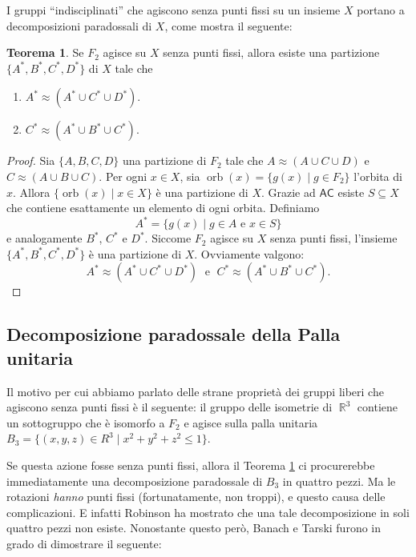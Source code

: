 \documentclass[12pt,a4paper]{report}
\theoremstyle{definition}
\newtheorem{teo}{Teorema}[section]  %
\theoremstyle{num.custom-title}
\DeclareMathOperator{\orb}{orb}
\DeclareMathOperator{\R}{\mathbb{R}}
\newcommand{\AC}{\ensuremath{\mathsf{AC}}\xspace}
\begin{document}
I gruppi ``indisciplinati'' che agiscono senza punti fissi su un insieme $X$ portano a decomposizioni paradossali di $X$, come mostra il seguente:

\begin{teo}\label{decomp_F2}
Se $F_2$ agisce su $X$ senza punti fissi, allora esiste una partizione $\{A^*,B^*,C^*,D^*\}$ di $X$ tale che 
\begin{enumerate}
\item $A^* \approx (A^* \cup C^* \cup D^*)$.
\item $C^* \approx (A^* \cup B^* \cup C^*)$.
\end{enumerate}
\begin{proof}
Sia $\{A,B,C,D\}$ una partizione di $F_2$ tale che $A \approx (A \cup C \cup D)$ e $C \approx (A \cup B \cup C)$. Per ogni $x \in X$, sia $\orb(x)=\{g(x) \mid g \in F_2\}$ l'orbita di $x$. Allora $\{\orb(x) \mid x \in X\}$ è una partizione di $X$. Grazie ad \AC esiste $S \subseteq X$ che contiene esattamente un elemento di ogni orbita. Definiamo
\[
A^*=\{g(x) \mid g \in A \text{ e } x \in S\}
\]
e analogamente $B^*$, $C^*$ e $D^*$. Siccome $F_2$ agisce su $X$ senza punti fissi, l'insieme $\{A^*,B^*,C^*,D^*\}$ è una partizione di $X$. Ovviamente valgono:
\[
A^* \approx (A^* \cup C^* \cup D^*) \; \text{ e } \; C^* \approx (A^* \cup B^* \cup C^*).
\]
\end{proof}
\end{teo}



\subsection{Decomposizione paradossale della Palla unitaria}

Il motivo per cui abbiamo parlato delle strane proprietà dei gruppi liberi che agiscono senza punti fissi è il seguente: il gruppo delle isometrie di $\R^3$ contiene un sottogruppo che è isomorfo a $F_2$ e agisce sulla palla unitaria $B_3=\{(x,y,z) \in R^3 \mid x^2+y^2+z^2 \leq 1\}$.

Se questa azione fosse senza punti fissi, allora il Teorema \ref{decomp_F2} ci procurerebbe immediatamente una decomposizione paradossale di $B_3$ in quattro pezzi. Ma le rotazioni \emph{hanno} punti fissi (fortunatamente, non troppi), e questo causa delle complicazioni. E infatti Robinson ha mostrato che una tale decomposizione in soli quattro pezzi non esiste. Nonostante questo però, Banach e Tarski furono in grado di dimostrare il seguente:
\end{document}
